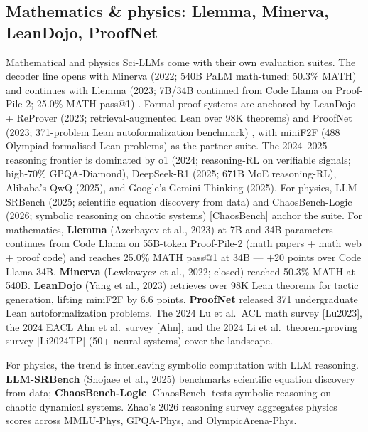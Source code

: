 \documentclass{article}
\begin{document}
\subsection{Mathematics \& physics: Llemma, Minerva, LeanDojo, ProofNet}\label{mathematics-physics-llemma-minerva-leandojo-proofnet}

Mathematical and physics Sci-LLMs come with their own evaluation suites. The decoder line opens with Minerva (2022; 540B PaLM math-tuned; 50.3\% MATH) and continues with Llemma (2023; 7B/34B continued from Code Llama on Proof-Pile-2; 25.0\% MATH pass@1) \cite{azerbayev2023llemmaanopenlangua}. Formal-proof systems are anchored by LeanDojo + ReProver (2023; retrieval-augmented Lean over 98K theorems) \cite{yang2023leandojotheorempro} and ProofNet (2023; 371-problem Lean autoformalization benchmark) \cite{azerbayev2023arxiv2302124332023}, with miniF2F (488 Olympiad-formalised Lean problems) as the partner suite. The 2024--2025 reasoning frontier is dominated by o1 (2024; reasoning-RL on verifiable signals; high-70\% GPQA-Diamond), DeepSeek-R1 (2025; 671B MoE reasoning-RL), Alibaba's QwQ (2025), and Google's Gemini-Thinking (2025). For physics, LLM-SRBench (2025; scientific equation discovery from data) \cite{shojaee2025llmsrbenchanewbenc} and ChaosBench-Logic (2026; symbolic reasoning on chaotic systems) {[}ChaosBench{]} anchor the suite. For mathematics, \textbf{Llemma} (Azerbayev et al., 2023) \cite{azerbayev2023llemmaanopenlangua} at 7B and 34B parameters continues from Code Llama on 55B-token Proof-Pile-2 (math papers + math web + proof code) and reaches 25.0\% MATH pass@1 at 34B --- +20 points over Code Llama 34B. \textbf{Minerva} (Lewkowycz et al., 2022; closed) reached 50.3\% MATH at 540B. \textbf{LeanDojo} (Yang et al., 2023) \cite{yang2023leandojotheorempro} retrieves over 98K Lean theorems for tactic generation, lifting miniF2F by 6.6 points. \textbf{ProofNet} \cite{azerbayev2023arxiv2302124332023} released 371 undergraduate Lean autoformalization problems. The 2024 Lu et al.~ACL math survey {[}Lu2023{]}, the 2024 EACL Ahn et al.~survey {[}Ahn{]}, and the 2024 Li et al.~theorem-proving survey {[}Li2024TP{]} (50+ neural systems) cover the landscape.

For physics, the trend is interleaving symbolic computation with LLM reasoning. \textbf{LLM-SRBench} (Shojaee et al., 2025) \cite{shojaee2025llmsrbenchanewbenc} benchmarks scientific equation discovery from data; \textbf{ChaosBench-Logic} {[}ChaosBench{]} tests symbolic reasoning on chaotic dynamical systems. Zhao's 2026 reasoning survey \cite{zhao2026appliedandcomputat} aggregates physics scores across MMLU-Phys, GPQA-Phys, and OlympicArena-Phys.
\end{document}

